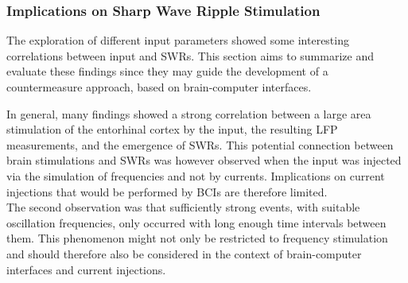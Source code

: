             
        \subsubsection{Implications on Sharp Wave Ripple Stimulation}
        The exploration of different input parameters showed some interesting correlations between input and SWRs. This section aims to summarize and evaluate these findings since they may guide the development of a countermeasure approach, based on brain-computer interfaces.
        
        In general, many findings showed a strong correlation between a large area stimulation of the entorhinal cortex by the input, the resulting LFP measurements, and the emergence of SWRs. This potential connection between brain stimulations and SWRs was however observed when the input was injected via the simulation of frequencies and not by currents. Implications on current injections that would be performed by BCIs are therefore limited.\\
        The second observation was that sufficiently strong events, with suitable oscillation frequencies, only occurred with long enough time intervals between them. This phenomenon might not only be restricted to frequency stimulation and should therefore also be considered in the context of brain-computer interfaces and current injections. 

            
        
